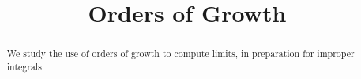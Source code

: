 \documentclass{ximera}
\title{Orders of Growth}
\begin{document}
\begin{abstract}
We study the use of orders of growth to compute limits, in preparation for improper integrals.
\end{abstract}
\maketitle

\begin{example}

\end{example}

\begin{example}

\end{example}
\end{document}
